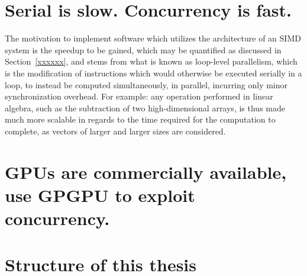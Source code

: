\section{Serial is slow. Concurrency is fast.}
The motivation to implement software which utilizes the architecture of an SIMD system is the speedup to be gained, which may be quantified as discussed in Section~\ref{xxxxxx}, and stems from what is known as loop-level parallelism, which is the modification of instructions which would otherwise be executed serially in a loop, to instead be computed simultaneously, in parallel, incurring only minor synchronization overhead. For example: any operation performed in linear algebra, such as the subtraction of two high-dimensional arrays, is thus made much more scalable in regards to the time required for the computation to complete, as vectors of larger and larger sizes are considered.

%
\section{GPUs are commercially available, use GPGPU to exploit concurrency.}
%
\section{Structure of this thesis}
